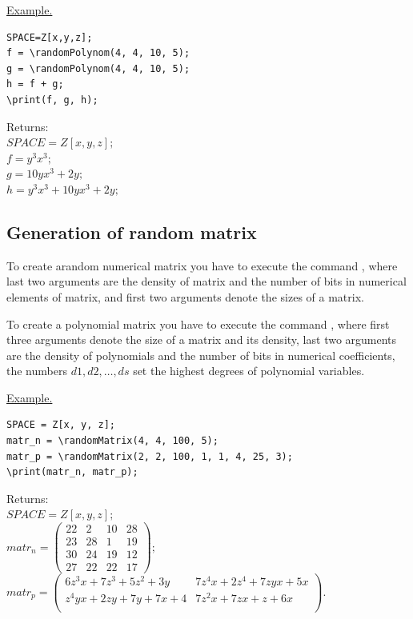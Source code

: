 \smallskip

\underline{Example. }

\vspace*{-3mm}

\begin{verbatim}
SPACE=Z[x,y,z];
f = \randomPolynom(4, 4, 10, 5);
g = \randomPolynom(4, 4, 10, 5);
h = f + g;
\print(f, g, h);
\end{verbatim}

Returns: \\ 
$SPACE=Z[x,y,z]; $\\
$f = y^{3}x^{3}; $\\
$g = 10yx^{3}+2y; $\\
$h = y^{3}x^{3}+10yx^{3}+2y; $

\subsection{Generation of random matrix}
To create arandom numerical matrix you have to execute the command 
,  
where last two arguments are the density of matrix and the number of bits in numerical elements of matrix, and first two arguments denote the sizes of a matrix. 

To create a polynomial matrix you have to execute the command 
, 
 where first three arguments denote the size of a matrix and its density, last two arguments are the density of polynomials and the number of bits in numerical coefficients, the numbers $d1, d2,\ldots, ds$ set the highest degrees of polynomial variables.

\smallskip

\underline{Example. }

\vspace*{-3mm}

\begin{verbatim}
SPACE = Z[x, y, z];
matr_n = \randomMatrix(4, 4, 100, 5);
matr_p = \randomMatrix(2, 2, 100, 1, 1, 4, 25, 3);
\print(matr_n, matr_p);
\end{verbatim}

Returns:\\
$SPACE=Z[x,y,z]; $\\
$matr_n =\left(\begin{array}{cccc}22 &2 & 10 &28 \\ 23 &28 &1 & 19 \\ 30 &24 &19 &12 \\ 27 &22 &22 &17 \end{array}\right) ; $ \\
$matr_p =\left(\begin{array}{cc}
6z^3x+7z^3+5z^2+3y & 7z^4x+2z^4+7zyx+5x\\
 z^4yx+2zy+7y+7x+4&  7z^2x+7zx+z+6x \\
 \end{array}\right). $
 
